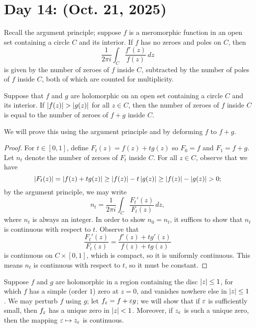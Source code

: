 \section{Day 14: (Oct. 21, 2025)}
Recall the argument principle; suppose $f$ is a meromorphic function in an open set containing a circle $C$ and its interior. If $f$ has no zeroes and poles on $C$, then
\[ \frac{1}{2\pi i} \int_C \frac{f'(z)}{f(z)} \, dz \]
is given by the number of zeroes of $f$ inside $C$, subtracted by the number of poles of $f$ inside $C$, both of which are counted for multiplicity.
\begin{theorem}
    Suppose that $f$ and $g$ are holomorphic on an open set containing a circle $C$ and its interior. If $\left\lvert f(z) \right\rvert > \left\lvert g(z) \right\rvert$ for all $z \in C$, then the number of zeroes of $f$ inside $C$ is equal to the number of zeroes of $f + g$ inside $C$.
\end{theorem}
\noindent We will prove this using the argument principle and by deforming $f$ to $f + g$.
\begin{proof}
    For $t \in [0, 1]$, define $F_t(z) = f(z) + tg(z)$ so $F_0 = f$ and $F_1 = f + g$. Let $n_t$ denote the number of zeroes of $F_t$ inside $C$. For all $z \in C$, observe that we have
    \[ \left\lvert F_t(z) \right\rvert = \left\lvert f(z) + tg(z) \right\rvert \geq \left\lvert f(z) \right\rvert - t \left\lvert g(z) \right\rvert \geq \left\lvert f(z) \right\rvert - \left\lvert g(z) \right\rvert > 0; \]
    by the argument principle, we may write
    \[ n_t = \frac{1}{2\pi i} \int_C \frac{F_t'(z)}{F_t(z)} \, dz, \]
    where $n_t$ is always an integer. In order to show $n_0 = n_t$, it suffices to show that $n_t$ is continuous with respect to $t$. Observe that
    \[ \frac{F_t'(z)}{F_t(z)} = \frac{f'(z) + tg'(z)}{f(z) + tg(z)} \]
    is continuous on $C \times [0, 1]$, which is compact, so it is uniformly continuous. This means $n_t$ is continuous with respect to $t$, so it must be constant.
\end{proof}
\begin{example}
    Suppose $f$ and $g$ are holomorphic in a region containing the disc $\left\lvert z \right\rvert \leq 1$, for which $f$ has a simple (order $1$) zero at $z = 0$, and vanishes nowhere else in $\left\lvert z \right\rvert \leq 1$. We may perturb $f$ using $g$; let $f_\varepsilon = f + \varepsilon g$; we will show that if $\varepsilon$ is sufficiently small, then $f_\varepsilon$ has a unique zero in $\left\lvert z \right\rvert < 1$. Moreover, if $z_\varepsilon$ is such a unique zero, then the mapping $\varepsilon \mapsto z_\varepsilon$ is continuous.
\end{example}
